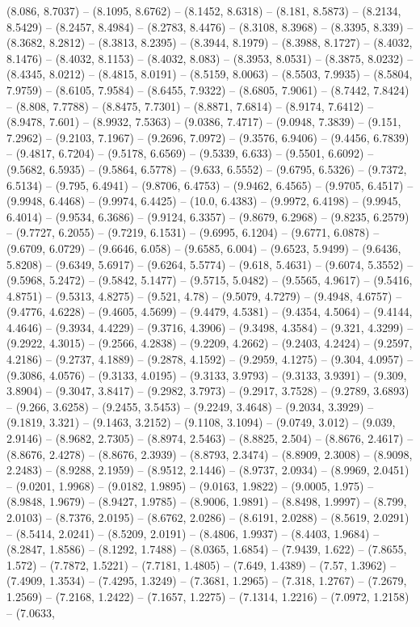 (8.086, 8.7037) -- (8.1095, 8.6762) -- (8.1452, 8.6318) -- (8.181, 8.5873) -- (8.2134, 8.5429) -- (8.2457, 8.4984) -- (8.2783, 8.4476) -- (8.3108, 8.3968) -- (8.3395, 8.339) -- (8.3682, 8.2812) -- (8.3813, 8.2395) -- (8.3944, 8.1979) -- (8.3988, 8.1727) -- (8.4032, 8.1476) -- (8.4032, 8.1153) -- (8.4032, 8.083) -- (8.3953, 8.0531) -- (8.3875, 8.0232) -- (8.4345, 8.0212) -- (8.4815, 8.0191) -- (8.5159, 8.0063) -- (8.5503, 7.9935) -- (8.5804, 7.9759) -- (8.6105, 7.9584) -- (8.6455, 7.9322) -- (8.6805, 7.9061) -- (8.7442, 7.8424) -- (8.808, 7.7788) -- (8.8475, 7.7301) -- (8.8871, 7.6814) -- (8.9174, 7.6412) -- (8.9478, 7.601) -- (8.9932, 7.5363) -- (9.0386, 7.4717) -- (9.0948, 7.3839) -- (9.151, 7.2962) -- (9.2103, 7.1967) -- (9.2696, 7.0972) -- (9.3576, 6.9406) -- (9.4456, 6.7839) -- (9.4817, 6.7204) -- (9.5178, 6.6569) -- (9.5339, 6.633) -- (9.5501, 6.6092) -- (9.5682, 6.5935) -- (9.5864, 6.5778) -- (9.633, 6.5552) -- (9.6795, 6.5326) -- (9.7372, 6.5134) -- (9.795, 6.4941) -- (9.8706, 6.4753) -- (9.9462, 6.4565) -- (9.9705, 6.4517) -- (9.9948, 6.4468) -- (9.9974, 6.4425) -- (10.0, 6.4383) -- (9.9972, 6.4198) -- (9.9945, 6.4014) -- (9.9534, 6.3686) -- (9.9124, 6.3357) -- (9.8679, 6.2968) -- (9.8235, 6.2579) -- (9.7727, 6.2055) -- (9.7219, 6.1531) -- (9.6995, 6.1204) -- (9.6771, 6.0878) -- (9.6709, 6.0729) -- (9.6646, 6.058) -- (9.6585, 6.004) -- (9.6523, 5.9499) -- (9.6436, 5.8208) -- (9.6349, 5.6917) -- (9.6264, 5.5774) -- (9.618, 5.4631) -- (9.6074, 5.3552) -- (9.5968, 5.2472) -- (9.5842, 5.1477) -- (9.5715, 5.0482) -- (9.5565, 4.9617) -- (9.5416, 4.8751) -- (9.5313, 4.8275) -- (9.521, 4.78) -- (9.5079, 4.7279) -- (9.4948, 4.6757) -- (9.4776, 4.6228) -- (9.4605, 4.5699) -- (9.4479, 4.5381) -- (9.4354, 4.5064) -- (9.4144, 4.4646) -- (9.3934, 4.4229) -- (9.3716, 4.3906) -- (9.3498, 4.3584) -- (9.321, 4.3299) -- (9.2922, 4.3015) -- (9.2566, 4.2838) -- (9.2209, 4.2662) -- (9.2403, 4.2424) -- (9.2597, 4.2186) -- (9.2737, 4.1889) -- (9.2878, 4.1592) -- (9.2959, 4.1275) -- (9.304, 4.0957) -- (9.3086, 4.0576) -- (9.3133, 4.0195) -- (9.3133, 3.9793) -- (9.3133, 3.9391) -- (9.309, 3.8904) -- (9.3047, 3.8417) -- (9.2982, 3.7973) -- (9.2917, 3.7528) -- (9.2789, 3.6893) -- (9.266, 3.6258) -- (9.2455, 3.5453) -- (9.2249, 3.4648) -- (9.2034, 3.3929) -- (9.1819, 3.321) -- (9.1463, 3.2152) -- (9.1108, 3.1094) -- (9.0749, 3.012) -- (9.039, 2.9146) -- (8.9682, 2.7305) -- (8.8974, 2.5463) -- (8.8825, 2.504) -- (8.8676, 2.4617) -- (8.8676, 2.4278) -- (8.8676, 2.3939) -- (8.8793, 2.3474) -- (8.8909, 2.3008) -- (8.9098, 2.2483) -- (8.9288, 2.1959) -- (8.9512, 2.1446) -- (8.9737, 2.0934) -- (8.9969, 2.0451) -- (9.0201, 1.9968) -- (9.0182, 1.9895) -- (9.0163, 1.9822) -- (9.0005, 1.975) -- (8.9848, 1.9679) -- (8.9427, 1.9785) -- (8.9006, 1.9891) -- (8.8498, 1.9997) -- (8.799, 2.0103) -- (8.7376, 2.0195) -- (8.6762, 2.0286) -- (8.6191, 2.0288) -- (8.5619, 2.0291) -- (8.5414, 2.0241) -- (8.5209, 2.0191) -- (8.4806, 1.9937) -- (8.4403, 1.9684) -- (8.2847, 1.8586) -- (8.1292, 1.7488) -- (8.0365, 1.6854) -- (7.9439, 1.622) -- (7.8655, 1.572) -- (7.7872, 1.5221) -- (7.7181, 1.4805) -- (7.649, 1.4389) -- (7.57, 1.3962) -- (7.4909, 1.3534) -- (7.4295, 1.3249) -- (7.3681, 1.2965) -- (7.318, 1.2767) -- (7.2679, 1.2569) -- (7.2168, 1.2422) -- (7.1657, 1.2275) -- (7.1314, 1.2216) -- (7.0972, 1.2158) -- (7.0633, 